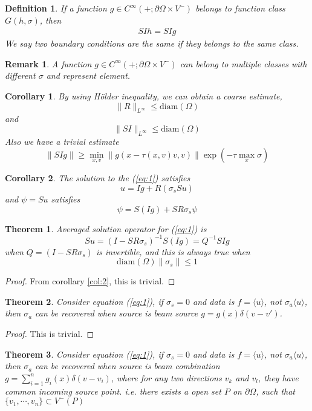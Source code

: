 \documentclass[12pt,a4paper]{article}
\newcommand{\avg}[1]{\langle#1\rangle}
\newtheorem{Def}{Definition}
\newtheorem{Thm}{Theorem}
\newtheorem{Col}{Corollary}
\newtheorem{Rek}{Remark}
\begin{document}
\begin{Def}
If a function $g\in C^{\infty}(+;\partial\Omega\times V^{-})$ belongs to function class $G(h,\sigma)$, then
\begin{eqnarray}
SIh = SIg
\end{eqnarray}
We say two boundary conditions are the same if they belongs to the same class.
\end{Def}\label{def:4}
\begin{Rek}
A function $g\in C^{\infty}(+;\partial\Omega\times V^{-})$ can belong to multiple classes with different $\sigma$ and represent element.
\end{Rek}
\begin{Col} By using H\"{o}lder inequality, we can obtain a coarse estimate,
$$\|R\|_{L^{\infty}} \le \mathrm{diam}(\Omega)$$ 
and 
$$\|SI\|_{L^{\infty}} \le \mathrm{diam}(\Omega)$$
Also we have a trivial estimate
$$\|SIg\|\ge \min_{x,v}\|g(x-\tau(x,v)v,v)\|\exp(-\tau\max_{x}\sigma)$$
\end{Col}\label{col:1}
\begin{Col}
The solution to the (\ref{eq:1}) satisfies
$$u = Ig + R(\sigma_sSu)$$
and $\psi = Su$ satisfies
$$\psi = S(Ig) + SR\sigma_s\psi$$
\end{Col}\label{col:2}
\begin{Thm}
Averaged solution operator for (\ref{eq:1}) is
\begin{equation}
Su = (I - SR\sigma_s)^{-1}S(Ig) = Q^{-1}SIg
\end{equation}
when $Q=(I - SR\sigma_s)$ is invertible, and this is always true when $$\mathrm{diam}(\Omega)\|\sigma_s\| \le 1$$
\end{Thm}\label{thm:1}
\begin{proof}
From corollary \ref{col:2}, this is trivial.
\end{proof}\label{pr:1}
\begin{Thm}
Consider equation (\ref{eq:1}), if $\sigma_s = 0$ and data is $f= \avg{u}$, not $\sigma_a\avg{u}$, then $\sigma_a$ can be recovered when source is beam source $g =g(x)\delta(v-v')$.
\end{Thm}\label{thm:2}
\begin{proof}
This is trivial.
\end{proof}
\begin{Thm}
Consider equation (\ref{eq:1}), if $\sigma_s = 0$ and data is $f= \avg{u}$, not $\sigma_a\avg{u}$, then $\sigma_a$ can be recovered when source is beam combination $g =\sum_{i=1}^n g_i(x)\delta(v-v_i)$, where for any two directions $v_k$ and $v_l$, they have common incoming source point. i.e. there exists a open set $P$ on $\partial\Omega$, such that $\{v_1,\cdots, v_n\}\subset V^{-}(P)$
\end{Thm}
\end{document}

